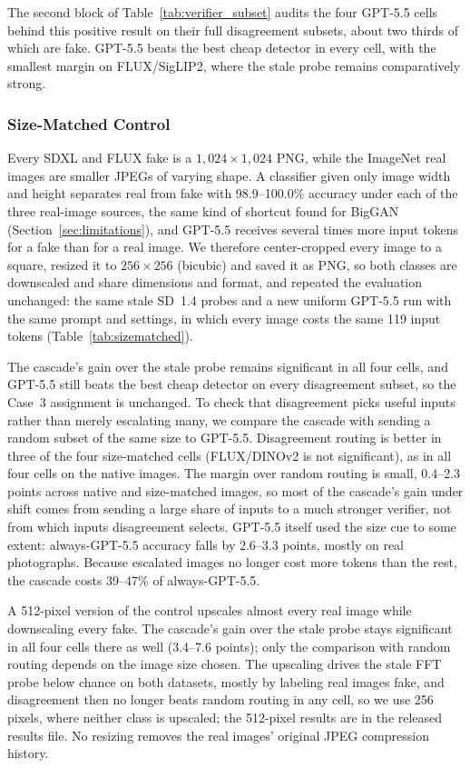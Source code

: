\documentclass{ieeeaccess}
\begin{document}
The second block of Table~\ref{tab:verifier_subset} audits the four GPT-5.5 cells behind this positive result on their full disagreement subsets, about two thirds of which are fake. GPT-5.5 beats the best cheap detector in every cell, with the smallest margin on FLUX/SigLIP2, where the stale probe remains comparatively strong.

\subsubsection{Size-Matched Control}
\label{sec:sizematched}

Every SDXL and FLUX fake is a $1{,}024{\times}1{,}024$ PNG, while the ImageNet real
images are smaller JPEGs of varying shape. A classifier given only image width and height
separates real from fake with 98.9--100.0\% accuracy under each of the three real-image
sources, the same kind of shortcut found for BigGAN (Section~\ref{sec:limitations}), and
GPT-5.5 receives several times more input tokens for a fake than for a real image. We
therefore center-cropped every image to a square, resized it to $256{\times}256$
(bicubic) and saved it as PNG, so both classes are downscaled and share dimensions and
format, and repeated the evaluation unchanged: the same stale SD~1.4 probes and a new
uniform GPT-5.5 run with the same prompt and settings, in which every image costs the
same 119 input tokens (Table~\ref{tab:sizematched}).

The cascade's gain over the stale probe remains significant in all four cells, and
GPT-5.5 still beats the best cheap detector on every disagreement subset, so the Case~3
assignment is unchanged. To check that disagreement picks useful inputs rather than
merely escalating many, we compare the cascade with sending a random subset of the same
size to GPT-5.5. Disagreement routing is better in three of the four size-matched cells
(FLUX/DINOv2 is not significant), as in all four cells on the native images. The margin
over random routing is small, 0.4--2.3 points across native and size-matched images, so
most of the cascade's gain under shift comes from sending a large share of inputs to a
much stronger verifier, not from which inputs disagreement selects. GPT-5.5
itself used the size cue to some extent: always-GPT-5.5 accuracy falls by 2.6--3.3
points, mostly on real photographs. Because escalated images no longer cost more tokens
than the rest, the cascade costs 39--47\% of always-GPT-5.5.

A 512-pixel version of the control upscales almost every real image while downscaling
every fake. The cascade's gain over the stale probe stays significant in all four cells
there as well (3.4--7.6 points); only the comparison with random routing depends on the
image size chosen. The upscaling drives the stale FFT probe below chance on both datasets,
mostly by labeling real images fake, and disagreement then no longer beats random
routing in any cell, so we use 256 pixels, where neither class is upscaled; the
512-pixel results are in the released results file. No resizing removes the real
images' original JPEG compression history.
\end{document}
